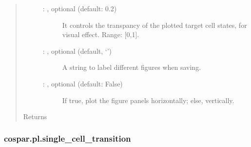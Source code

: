 \documentclass[letterpaper,10pt,english]{sphinxmanual}
\begin{document}
\begin{fulllineitems}
\begin{quote}
\begin{description}
\begin{description}
\item[{ : , optional (default: 0.2)}] \leavevmode
It controls the transpancy of the plotted target cell states,
for visual effect. Range: {[}0,1{]}.

\item[{ : , optional (default, ‘’)}] \leavevmode
A string to label different figures when saving.

\item[{ : , optional (default: False)}] \leavevmode
If true, plot the figure panels horizontally; else, vertically.

\end{description}

\item[{Returns}] \leavevmode
{}

\end{description}\end{quote}

\end{fulllineitems}



\subsubsection{cospar.pl.single\_cell\_transition}
\label{\detokenize{cospar.pl.single_cell_transition:cospar-pl-single-cell-transition}}\label{\detokenize{cospar.pl.single_cell_transition::doc}}
\end{document}
